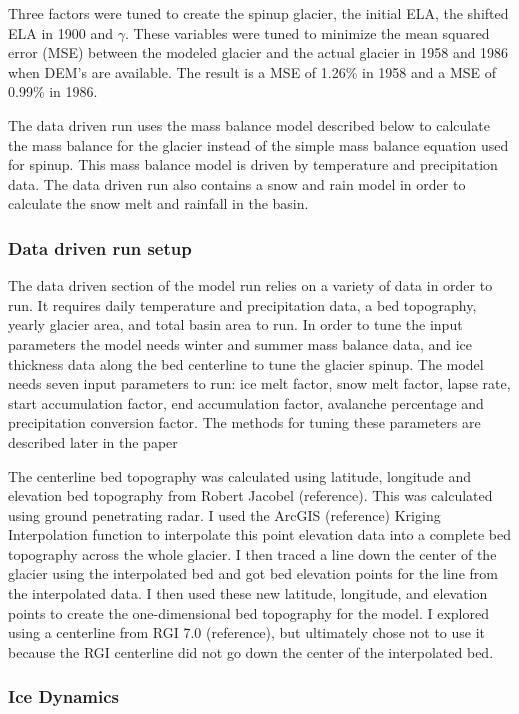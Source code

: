 \documentclass{article}
\begin{document}
Three factors were tuned to create the spinup glacier, the initial ELA, the shifted ELA in 1900 and $\gamma$. These variables were tuned to 
minimize the mean squared error (MSE) between the modeled glacier and the actual glacier in 1958 and 1986 when DEM's are available. The result is 
a MSE of 1.26\% in 1958 and a MSE of 0.99\% in 1986.

The data driven run uses the mass balance model described below to calculate the mass balance for the glacier instead of the simple mass balance 
equation used for spinup. This mass balance model is driven by temperature and precipitation data. The data driven run also contains a snow and 
rain model in order to calculate the snow melt and rainfall in the basin.

\subsubsection{Data driven run setup}
The data driven section of the model run relies on a variety of data in order to run. It requires daily temperature and precipitation data, 
a bed topography, yearly glacier area, and total basin area to run. In order to tune the input parameters the model needs winter and summer mass balance 
data, and ice thickness data along the bed centerline to tune the glacier spinup. The model needs seven input parameters to run: ice melt factor, 
snow melt factor, lapse rate, start accumulation factor, end 
accumulation factor, avalanche percentage and precipitation conversion factor. The methods for tuning these parameters are described later in the paper

The centerline bed topography was calculated using latitude, longitude and elevation bed topography from Robert Jacobel (reference). This  was calculated using 
ground penetrating radar. I used the ArcGIS (reference) Kriging Interpolation function to interpolate this point elevation data into a complete 
bed topography across the whole glacier. I then traced a line down the center of the glacier using the interpolated bed and got bed elevation points for the line 
from the interpolated data. I then used these new latitude, longitude, and elevation points to create the one-dimensional bed topography for 
the model. I explored using a centerline from RGI 7.0 (reference), but ultimately chose not to use it because the RGI centerline did not go 
down the center of the interpolated bed.

\subsubsection{Ice Dynamics}
\end{document}
